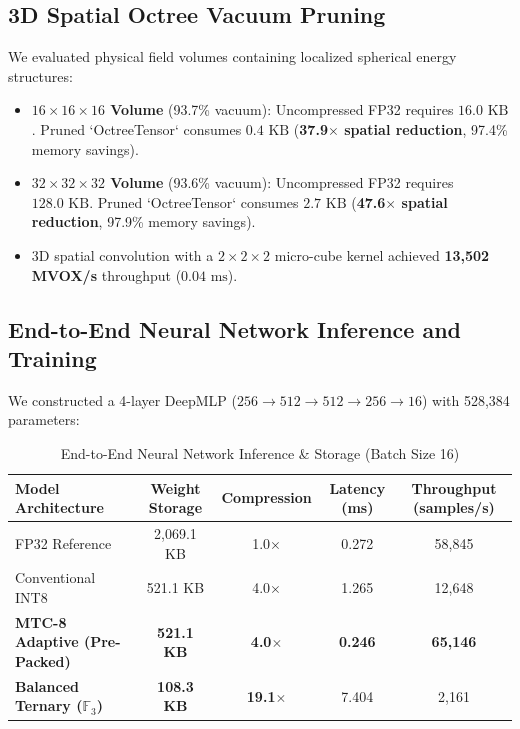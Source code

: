 \documentclass[11pt,a4paper]{article}
\begin{document}
\subsection{3D Spatial Octree Vacuum Pruning}
We evaluated physical field volumes containing localized spherical energy structures:
\begin{itemize}
    \item \textbf{$16\times 16\times 16$ Volume} (93.7\% vacuum): Uncompressed FP32 requires $16.0\text{ KB}$. Pruned `OctreeTensor` consumes $0.4\text{ KB}$ (\textbf{37.9$\times$ spatial reduction}, 97.4\% memory savings).
    \item \textbf{$32\times 32\times 32$ Volume} (93.6\% vacuum): Uncompressed FP32 requires $128.0\text{ KB}$. Pruned `OctreeTensor` consumes $2.7\text{ KB}$ (\textbf{47.6$\times$ spatial reduction}, 97.9\% memory savings).
    \item 3D spatial convolution with a $2\times 2\times 2$ micro-cube kernel achieved \textbf{13,502 MVOX/s} throughput ($0.04\text{ ms}$).
\end{itemize}

\subsection{End-to-End Neural Network Inference and Training}
We constructed a 4-layer DeepMLP ($256 \to 512 \to 512 \to 256 \to 16$) with 528,384 parameters:

\begin{table}[ht]
\centering
\small
\caption{End-to-End Neural Network Inference \& Storage (Batch Size 16)}
\label{tab:nn}
\begin{tabular}{lcccc}
\toprule
\textbf{Model Architecture} & \textbf{Weight Storage} & \textbf{Compression} & \textbf{Latency (ms)} & \textbf{Throughput (samples/s)} \\
\midrule
FP32 Reference & 2,069.1 KB & 1.0$\times$ & 0.272 & 58,845 \\
Conventional INT8 & 521.1 KB & 4.0$\times$ & 1.265 & 12,648 \\
\textbf{MTC-8 Adaptive (Pre-Packed)} & \textbf{521.1 KB} & \textbf{4.0$\times$} & \textbf{0.246} & \textbf{65,146} \\
\textbf{Balanced Ternary ($\mathbb{F}_3$)} & \textbf{108.3 KB} & \textbf{19.1$\times$} & 7.404 & 2,161 \\
\bottomrule
\end{tabular}
\end{table}
\end{document}
